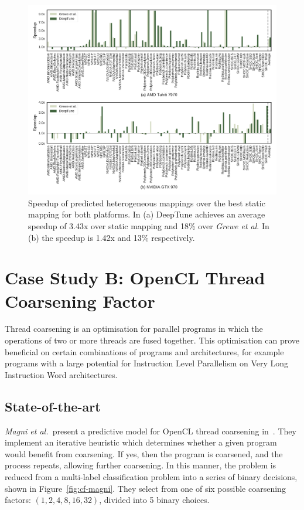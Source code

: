 \begin{figure}
	\centering %
	\includegraphics[width=\textwidth]{img/cgo-speedup}%
	\caption[Speedup of predicted heterogeneous mappings]{%
		Speedup of predicted heterogeneous mappings over the best static mapping for both platforms. In (a) DeepTune achieves an average speedup of 3.43x over static mapping and 18\% over \emph{Grewe et al}. In (b) the speedup is 1.42x and 13\% respectively.%
	}
	\label{fig:cgo-speedup}
\end{figure}



\section{Case Study B: OpenCL Thread Coarsening Factor}

Thread coarsening is an optimisation for parallel programs in which the operations of two or more threads are fused together. This optimisation can prove beneficial on certain combinations of programs and architectures, for example programs with a large potential for Instruction Level Parallelism on Very Long Instruction Word architectures.

\subsection{State-of-the-art} \emph{Magni et al.\ }present a predictive model for OpenCL thread coarsening in~\cite{Magni2014}. They implement an iterative heuristic which determines whether a given program would benefit from coarsening. If yes, then the program is coarsened, and the process repeats, allowing further coarsening. In this manner, the problem is reduced from a multi-label classification problem into a series of binary decisions, shown in Figure~\ref{fig:cf-magni}. They select from one of six possible coarsening factors: $(1, 2, 4, 8, 16, 32)$, divided into 5 binary choices.

